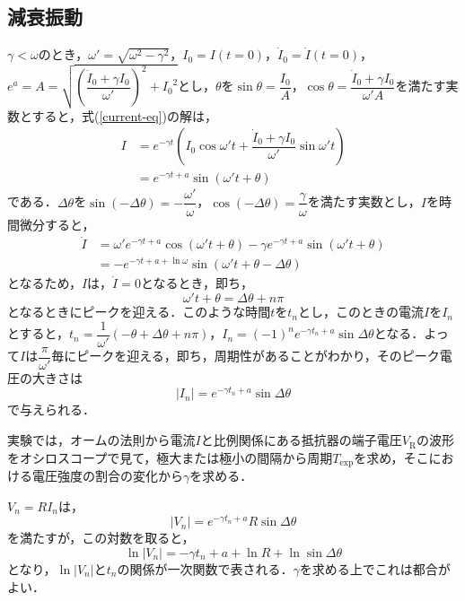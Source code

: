\documentclass[uplatex,dvipdfmx,a4paper,10pt]{jsarticle}
\begin{document}
\subsection{減衰振動}\label{sec:DO}
$\gamma < \omega$のとき，$\omega'=\sqrt{\omega^2 - \gamma^2}$，$I_0=I(t=0)$，$\dot{I}_0=\dot{I}(t=0)$，$e^a=A=\sqrt{\left( {\dfrac{\dot{I}_0+\gamma I_0}{\omega'}} \right)^2 + {I_0}^2}$とし，$\theta$を$\sin{\theta}=\dfrac{I_0}{A}$，$\cos{\theta}=\dfrac{\dot{I}_0+\gamma I_0}{\omega'A}$を満たす実数とすると，式(\ref{current-eq})の解は，
\begin{align}
    I &= e^{-\gamma t}\left( I_0\cos{\omega't} + \dfrac{\dot{I}_0+\gamma I_0}{\omega'}\sin{\omega't}\right)\\
    &= e^{-\gamma t + a} \sin\left( \omega't + \theta \right)
\end{align}
である．$\Delta\theta$を$\sin{\left( -\Delta\theta \right)}=-\dfrac{\omega'}{\omega}$，$\cos{\left( -\Delta\theta \right)}=\dfrac{\gamma}{\omega}$を満たす実数とし，$I$を時間微分すると，
\begin{align}
    \dot{I} &= \omega' e^{-\gamma t + a} \cos\left( \omega't + \theta \right) -\gamma e^{-\gamma t + a} \sin\left( \omega't + \theta \right)\\
    &= -e^{-\gamma t + a + \ln{\omega}} \sin\left( \omega't + \theta - \Delta\theta\right)
\end{align}
となるため，$I$は，$\dot{I}=0$となるとき，即ち，
\begin{equation}
    \omega't + \theta = \Delta\theta + n\pi
\end{equation}
となるときにピークを迎える．このような時間$t$を$t_n$とし，このときの電流$I$を$I_n$とすると，$t_n = \dfrac{1}{\omega'}\left( -\theta + \Delta\theta + n\pi \right)$，$I_n = (-1)^n e^{-\gamma t_n + a} \sin \Delta\theta $となる．よって$I$は$\dfrac{\pi}{\omega'}$毎にピークを迎える，即ち，周期性があることがわかり，そのピーク電圧の大きさは
\begin{equation}\label{I-strength}
    |I_n| = e^{-\gamma t_n + a}\sin \Delta\theta
\end{equation}で与えられる．

実験では，オームの法則から電流$I$と比例関係にある抵抗器の端子電圧$V_\mathrm{R}$の波形をオシロスコープで見て，極大または極小の間隔から周期$T_\mathrm{exp}$を求め，そこにおける電圧強度の割合の変化から$\gamma$を求める．

$V_n=RI_n$は，
\begin{equation}
    |V_n| = e^{-\gamma t_n + a}R\sin \Delta\theta
\end{equation}
を満たすが，この対数を取ると，
\begin{equation}\label{eq:DOlnV}
    \ln{|V_n|} = -\gamma t_n + a + \ln{R} + \ln{\sin\Delta\theta}
\end{equation}
となり，$\ln{|V_n|}$と$t_n$の関係が一次関数で表される．$\gamma$を求める上でこれは都合がよい．
\end{document}
